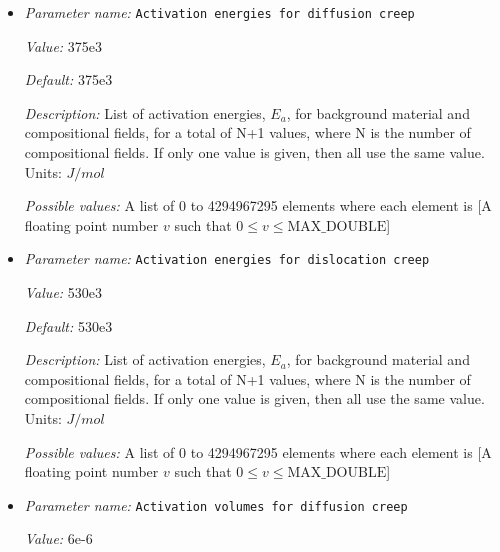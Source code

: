 \begin{itemize}
\item {\it Parameter name:} {\tt Activation energies for diffusion creep}
\label{parameters:Material model/Visco Plastic/Activation energies for diffusion creep}
\label{parameters:Material_20model/Visco_20Plastic/Activation_20energies_20for_20diffusion_20creep}


{\it Value:} 375e3


{\it Default:} 375e3


{\it Description:} List of activation energies, $E_a$, for background material and compositional fields, for a total of N+1 values, where N is the number of compositional fields. If only one value is given, then all use the same value.  Units: $J / mol$


{\it Possible values:} A list of 0 to 4294967295 elements where each element is [A floating point number $v$ such that $0 \leq v \leq \text{MAX\_DOUBLE}$]
\item {\it Parameter name:} {\tt Activation energies for dislocation creep}
\label{parameters:Material model/Visco Plastic/Activation energies for dislocation creep}
\label{parameters:Material_20model/Visco_20Plastic/Activation_20energies_20for_20dislocation_20creep}


{\it Value:} 530e3


{\it Default:} 530e3


{\it Description:} List of activation energies, $E_a$, for background material and compositional fields, for a total of N+1 values, where N is the number of compositional fields. If only one value is given, then all use the same value.  Units: $J / mol$


{\it Possible values:} A list of 0 to 4294967295 elements where each element is [A floating point number $v$ such that $0 \leq v \leq \text{MAX\_DOUBLE}$]
\item {\it Parameter name:} {\tt Activation volumes for diffusion creep}
\label{parameters:Material model/Visco Plastic/Activation volumes for diffusion creep}
\label{parameters:Material_20model/Visco_20Plastic/Activation_20volumes_20for_20diffusion_20creep}


{\it Value:} 6e-6



\end{itemize}
